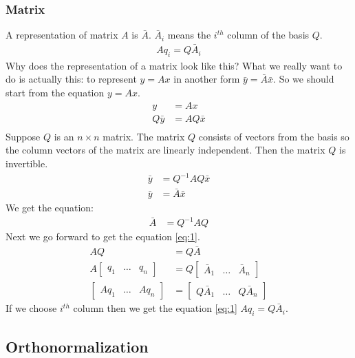 \documentclass{article}
\begin{document}
\subsubsection{Matrix}
A representation of matrix \(A\) is \(\bar{A}\). \(\bar{A}_i\) means the \(i^{th}\) column of the basis \(Q\).
\begin{align} \label{eq:1}
Aq_i=Q\bar{A}_i
\end{align}
Why does the representation of a matrix look like this? What we really want to do is actually this: to represent \(y=Ax\) in another form \(\bar{y}=\bar{A}\bar{x}\). So we should start from the equation \(y=Ax\).
\begin{align*}
y&=Ax \\
Q\bar{y}&=AQ\bar{x} \\
\end{align*}
Suppose \(Q\) is an \(n \times n\) matrix. The matrix \(Q\) consists of vectors from the basis so the column vectors of the matrix are linearly independent. Then the matrix \(Q\) is invertible.
\begin{align*}
\bar{y}&=Q^{-1}AQ\bar{x} \\
\bar{y}&=\bar{A}\bar{x}
\end{align*}
We get the equation:
\begin{align} \label{eq:similarity_transform}
\bar{A} &= Q^{-1}AQ
\end{align}
Next we go forward to get the equation \ref{eq:1}.
\begin{align*}
AQ&=Q\bar{A}\\
A\left[\begin{matrix} q_1 & \dots & q_n\end{matrix} \right]
&= Q\left[\begin{matrix} \bar{A}_1 & \dots & \bar{A}_n\end{matrix} \right] \\
\left[\begin{matrix} Aq_1 & \dots & Aq_n\end{matrix} \right]
&= \left[\begin{matrix} Q\bar{A}_1 & \dots & Q\bar{A}_n\end{matrix} \right]
\end{align*}
If we choose \(i^{th}\) column then we get the equation \ref{eq:1} \(Aq_i=Q\bar{A}_i\).

\subsection{Orthonormalization}
\end{document}
